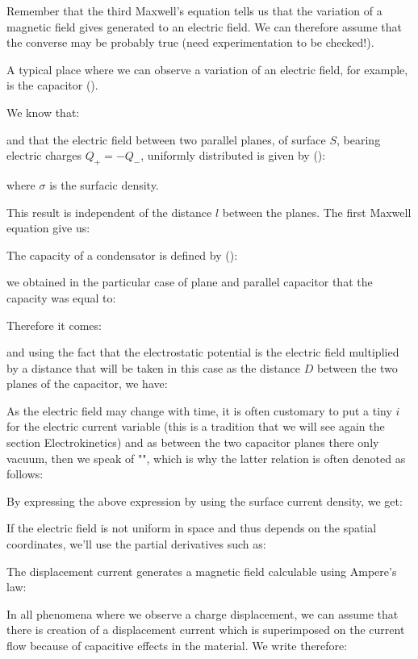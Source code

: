 	Remember that the third Maxwell's equation tells us that the variation of a magnetic field gives generated to an electric field. We can therefore assume that the converse may be probably true (need experimentation to be checked!).
	
	A typical place where we can observe a variation of an electric field, for example, is the capacitor ().
	
	We know that:
	
	and that the electric field between two parallel planes, of surface $S$, bearing electric charges $Q_+=-Q_-$, uniformly distributed is given by ():
	
	where $\sigma$ is the surfacic density.

	This result is independent of the distance $l$ between the planes. The first Maxwell equation give us:
	
	The capacity of a condensator is defined by ():
	
	we obtained in the particular case of plane and parallel capacitor that the capacity was equal to:
	
	Therefore it comes:
	
	and using the fact that the electrostatic potential is the electric field multiplied by a distance that will be taken in this case as the distance $D$ between the two planes of the capacitor, we have:
	
	As the electric field may change with time, it is often customary to put a tiny $i$ for the electric current variable (this is a tradition that we will see again the section Electrokinetics) and as between the two capacitor planes there only vacuum, then we speak of "", which is why the latter relation is often denoted as follows:
	
	By expressing the above expression by using the surface current density, we get:
	
	If the electric field is not uniform in space and thus depends on the spatial coordinates, we'll use the partial derivatives such as:
	
	The displacement current generates a magnetic field calculable using Ampere's law:
	
	In all phenomena where we observe a charge displacement, we can assume that there is creation of a displacement current which is superimposed on the current flow because of capacitive effects in the material. We write therefore:
	
